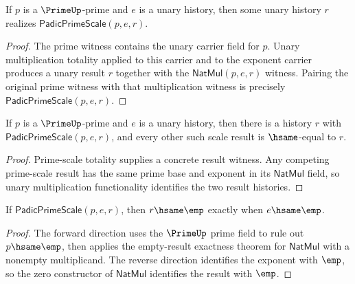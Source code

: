 \begin{theorem}
\label{thm:padic-prime-scale-total}
If \(p\) is a \(\PrimeUp\)-prime and \(e\) is a unary history, then some unary
history \(r\) realizes \(\mathsf{PadicPrimeScale}(p,e,r)\).
\end{theorem}
\begin{proof}
The prime witness contains the unary carrier field for \(p\). Unary
multiplication totality applied to this carrier and to the exponent carrier
produces a unary result \(r\) together with the \(\mathsf{NatMul}(p,e,r)\)
witness. Pairing the original prime witness with that multiplication witness
is precisely \(\mathsf{PadicPrimeScale}(p,e,r)\).
\end{proof}

\begin{theorem}
\label{thm:padic-prime-scale-exists-unique}
If \(p\) is a \(\PrimeUp\)-prime and \(e\) is a unary history, then there is a
history \(r\) with \(\mathsf{PadicPrimeScale}(p,e,r)\), and every other such
scale result is \(\hsame\)-equal to \(r\).
\end{theorem}
\begin{proof}
Prime-scale totality supplies a concrete result witness. Any competing
prime-scale result has the same prime base and exponent in its
\(\mathsf{NatMul}\) field, so unary multiplication functionality identifies
the two result histories.
\end{proof}

\begin{theorem}
\label{thm:padic-prime-scale-empty-result-iff-empty-exponent}
If \(\mathsf{PadicPrimeScale}(p,e,r)\), then \(r\hsame\emp\) exactly when
\(e\hsame\emp\).
\end{theorem}
\begin{proof}
The forward direction uses the \(\PrimeUp\) prime field to rule out
\(p\hsame\emp\), then applies the empty-result exactness theorem for
\(\mathsf{NatMul}\) with a nonempty multiplicand. The reverse direction
identifies the exponent with \(\emp\), so the zero constructor of
\(\mathsf{NatMul}\) identifies the result with \(\emp\).
\end{proof}

